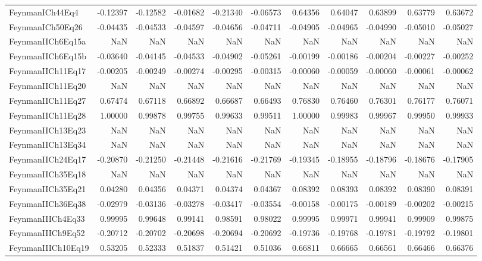 \begin{tabular}{lrrrrrrrrrr}
FeynmanICh44Eq4 & -0.12397 & -0.12582 & -0.01682 & -0.21340 & -0.06573 & 0.64356 & 0.64047 & 0.63899 & 0.63779 & 0.63672 \\
FeynmanICh50Eq26 & -0.04435 & -0.04533 & -0.04597 & -0.04656 & -0.04711 & -0.04905 & -0.04965 & -0.04990 & -0.05010 & -0.05027 \\
FeynmanIICh6Eq15a & NaN & NaN & NaN & NaN & NaN & NaN & NaN & NaN & NaN & NaN \\
FeynmanIICh6Eq15b & -0.03640 & -0.04145 & -0.04533 & -0.04902 & -0.05261 & -0.00199 & -0.00186 & -0.00204 & -0.00227 & -0.00252 \\
FeynmanIICh11Eq17 & -0.00205 & -0.00249 & -0.00274 & -0.00295 & -0.00315 & -0.00060 & -0.00059 & -0.00060 & -0.00061 & -0.00062 \\
FeynmanIICh11Eq20 & NaN & NaN & NaN & NaN & NaN & NaN & NaN & NaN & NaN & NaN \\
FeynmanIICh11Eq27 & 0.67474 & 0.67118 & 0.66892 & 0.66687 & 0.66493 & 0.76830 & 0.76460 & 0.76301 & 0.76177 & 0.76071 \\
FeynmanIICh11Eq28 & 1.00000 & 0.99878 & 0.99755 & 0.99633 & 0.99511 & 1.00000 & 0.99983 & 0.99967 & 0.99950 & 0.99933 \\
FeynmanIICh13Eq23 & NaN & NaN & NaN & NaN & NaN & NaN & NaN & NaN & NaN & NaN \\
FeynmanIICh13Eq34 & NaN & NaN & NaN & NaN & NaN & NaN & NaN & NaN & NaN & NaN \\
FeynmanIICh24Eq17 & -0.20870 & -0.21250 & -0.21448 & -0.21616 & -0.21769 & -0.19345 & -0.18955 & -0.18796 & -0.18676 & -0.17905 \\
FeynmanIICh35Eq18 & NaN & NaN & NaN & NaN & NaN & NaN & NaN & NaN & NaN & NaN \\
FeynmanIICh35Eq21 & 0.04280 & 0.04356 & 0.04371 & 0.04374 & 0.04367 & 0.08392 & 0.08393 & 0.08392 & 0.08390 & 0.08391 \\
FeynmanIICh36Eq38 & -0.02979 & -0.03136 & -0.03278 & -0.03417 & -0.03554 & -0.00158 & -0.00175 & -0.00189 & -0.00202 & -0.00215 \\
FeynmanIIICh4Eq33 & 0.99995 & 0.99648 & 0.99141 & 0.98591 & 0.98022 & 0.99995 & 0.99971 & 0.99941 & 0.99909 & 0.99875 \\
FeynmanIIICh9Eq52 & -0.20712 & -0.20702 & -0.20698 & -0.20694 & -0.20692 & -0.19736 & -0.19768 & -0.19781 & -0.19792 & -0.19801 \\
FeynmanIIICh10Eq19 & 0.53205 & 0.52333 & 0.51837 & 0.51421 & 0.51036 & 0.66811 & 0.66665 & 0.66561 & 0.66466 & 0.66376 \\

\end{tabular}
